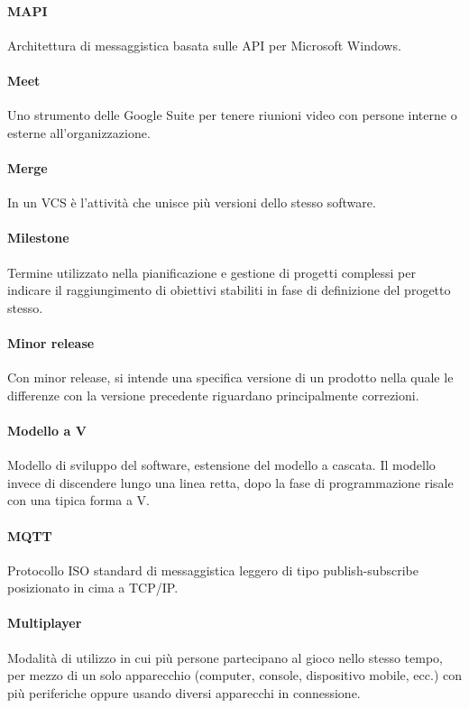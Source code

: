 \documentclass[]{article}
\begin{document}
	\paragraph*{MAPI}
	Architettura di messaggistica basata sulle API per Microsoft Windows.
	
	\paragraph*{Meet}
	Uno strumento delle Google Suite per tenere riunioni video con persone interne o esterne all'organizzazione.
	
	\paragraph*{Merge}
	In un VCS è l'attività che unisce più versioni dello stesso software.
	
	\paragraph*{Milestone}
	Termine utilizzato nella pianificazione e gestione di progetti complessi per indicare il raggiungimento di obiettivi stabiliti in fase di definizione del progetto stesso.
	
	\paragraph*{Minor release}
	Con minor release, si intende una specifica versione di un prodotto nella quale le differenze con la versione precedente riguardano principalmente correzioni.
	
	\paragraph*{Modello a V}
	Modello di sviluppo del software, estensione del modello a cascata. Il modello invece di discendere lungo una linea retta, dopo la fase di programmazione risale con una tipica forma a V.
	
	\paragraph*{MQTT}
	Protocollo ISO standard di messaggistica leggero di tipo publish-subscribe posizionato in cima a TCP/IP. 
	
	\paragraph*{Multiplayer}
	Modalità di utilizzo in cui più persone partecipano al gioco nello stesso tempo, per mezzo di un solo apparecchio (computer, console, dispositivo mobile, ecc.) con più periferiche oppure usando diversi apparecchi in connessione.
	
\end{document}
